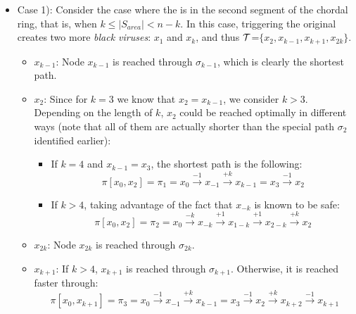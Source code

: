\begin{itemize}
\item Case 1): Consider the case where the \bv is in the second segment of the chordal ring, that is, when $k\leq |S_{area}| <n-k$. In this case, triggering the original \bv creates two more {\it black viruses}: $x_{1}$ and $x_{k}$, and thus $\cal T$=$\{x_{2},x_{k-1},x_{k+1},x_{2k}\}$.
\begin{itemize}

\item  $x_{k-1}$:  Node  $x_{k-1}$ is reached through $\sigma_{k-1}$, which is clearly  the shortest path.

\item $x_{2}$: Since for   $k=3$ we know that $x_2 =  x_{k-1}$, we  consider $k>3$.\\
Depending on the length of $k$,  $x_{2}$  could be reached  optimally  in different ways (note that  all of them are actually shorter than  the special  path $\sigma_2$ identified earlier):\\


 \begin{itemize} 
 \item If  $k = 4$ and $x_{k-1}=x_3$,  the shortest path is the following: %
$$ \pi[x_0,x_2] =   \pi_{1} =   x_{0}\xrightarrow {-1}x_{-1} \xrightarrow {+k}x_{k-1}=x_3\xrightarrow {-1}x_{2}$$
\item If   $k > 4$, taking advantage of the fact that $x_{-k}$ is known to be safe: 
$$ \pi[x_0,x_2] =   \pi_{2}  =   x_{0}\xrightarrow {-k}x_{-k} \xrightarrow {+1}x_{1-k}\xrightarrow {+1}x_{2-k}\xrightarrow {+k}x_{2}$$
\end{itemize}


\item $x_{2k}$:    Node  $x_{2k}$ is reached through $\sigma_{2k}$.
% 


\item$x_{k+1}$: 
If $ k >4$,    $x_{k+1}$ is reached through $\sigma_{k+1}$. 
Otherwise, it is reached faster  through:
$$ \pi[x_0,x_{k+1}] =    \pi_{3} =   x_{0}\xrightarrow {-1}x_{-1} \xrightarrow {+k}x_{k-1}=x_3 \xrightarrow {-1}x_{2}\xrightarrow {+k}x_{k+2}\xrightarrow {-1}x_{k+1}$$


\end{itemize}
\end{itemize}

